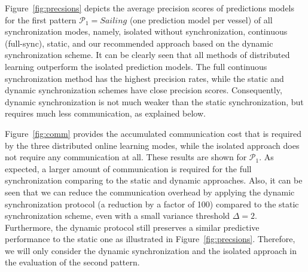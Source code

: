 \par Figure~\ref{fig:precsions} depicts the average precision scores of predictions models for the first pattern $\mathcal{P}_1=Sailing$ (one prediction model per vessel) of all synchronization modes, namely, isolated without synchronization, continuous (full-sync), static, and our recommended approach based on the dynamic synchronization scheme. It can be clearly seen that all methods of distributed learning outperform the isolated prediction models. The full continuous synchronization method has the highest precision rates, while the static and dynamic synchronization schemes have close precision scores. Consequently, dynamic synchronization is not much weaker than the static synchronization, but requires much less communication, as explained below.



\par Figure~\ref{fig:comm} provides the accumulated communication cost that is required by the three distributed online learning modes, while the isolated approach does not require any communication at all. These results are shown for $\mathcal{P}_1$.  As expected, a larger amount of communication is required for the full synchronization comparing to the static and dynamic approaches. Also, it can be seen that we can reduce the communication overhead by applying the dynamic synchronization protocol (a reduction by a factor of 100) compared to the static synchronization scheme, even with a small variance threshold $\Delta=2$. Furthermore, the dynamic  protocol still preserves a similar predictive performance to the static one as illustrated in Figure~\ref{fig:precsions}.  Therefore, we will only consider the dynamic synchronization and the isolated approach in the evaluation of the second pattern.

